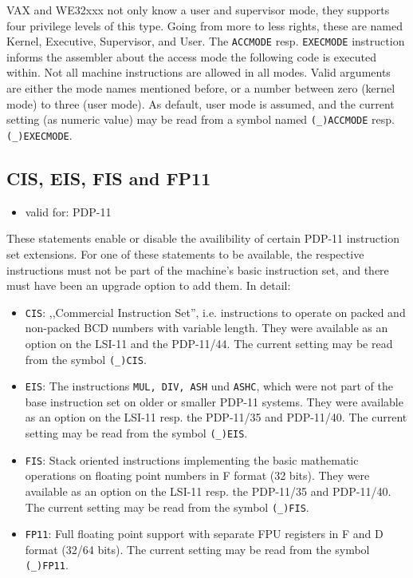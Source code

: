 \documentclass[12pt,twoside]{report}
\makeatletter
\newcommand{\ttindex}[1]{\index{#1@{\tt #1}}}
\newcommand{\predefsym}[1]{{\tt (\_)#1}}
\makeatother
\begin{document}
VAX and WE32xxx not only know a user and supervisor mode, they supports four privilege
levels of this type.  Going from more to less rights, these are named Kernel,
Executive, Supervisor, and User.  The {\tt ACCMODE} resp. {\tt EXECMODE} instruction informs the
assembler about the access mode the following code is executed within.  Not
all machine instructions are allowed in all modes.  Valid arguments are either
the mode names mentioned before, or a number between zero (kernel mode) to
three (user mode).  As default, user mode is assumed, and the current setting
(as numeric value) may be read from a symbol named \predefsym{ACCMODE} resp.
\predefsym{EXECMODE}.


\subsection{CIS, EIS, FIS and FP11}
\ttindex{CIS}\ttindex{EIS}\ttindex{FIS}\ttindex{FP11}

{\em
\begin{itemize}
\item{valid for: PDP-11}
\end{itemize}
}

These statements enable or disable the availibility of certain PDP-11
instruction set extensions.  For one of these statements to be available,
the respective instructions must not be part of the machine's basic
instruction set, and there must have been an upgrade option to add them.
In detail:

\begin{itemize}
\item{{\tt CIS}: ,,Commercial Instruction Set'', i.e. instructions to
      operate on packed and non-packed BCD numbers with variable length.
      They were available as an option on the LSI-11 and the PDP-11/44.
      The current setting may be read from the symbol \predefsym{CIS}.}
\item{{\tt EIS}: The instructions {\tt MUL, DIV, ASH} und {\tt ASHC},
      which were not part of the base instruction set on older or
      smaller PDP-11 systems.  They were available as an option on the
      LSI-11 resp. the PDP-11/35 and PDP-11/40.  The current setting
      may be read from the symbol \predefsym{EIS}.}
\item{{\tt FIS}: Stack oriented instructions implementing the basic
      mathematic operations on floating point numbers in F format (32 bits).
      They were available as an option on the LSI-11 resp. the PDP-11/35
      and PDP-11/40.  The current setting may be read from the symbol
      \predefsym{FIS}.}
\item{{\tt FP11}: Full floating point support with separate FPU registers
      in F and D format (32/64 bits).  The current setting may be read
      from the symbol \predefsym{FP11}.}
\end{itemize}
\end{document}
